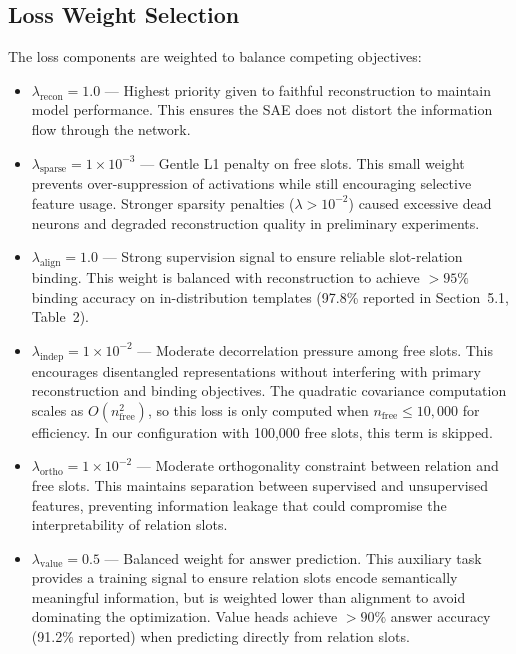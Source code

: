 \subsection{Loss Weight Selection}

The loss components are weighted to balance competing objectives:

\begin{itemize}[leftmargin=*,noitemsep]
    \item $\lambda_{\text{recon}} = 1.0$ --- Highest priority given to faithful reconstruction to maintain model performance. This ensures the SAE does not distort the information flow through the network.
    
    \item $\lambda_{\text{sparse}} = 1 \times 10^{-3}$ --- Gentle L1 penalty on free slots. This small weight prevents over-suppression of activations while still encouraging selective feature usage. Stronger sparsity penalties ($\lambda > 10^{-2}$) caused excessive dead neurons and degraded reconstruction quality in preliminary experiments.
    
    \item $\lambda_{\text{align}} = 1.0$ --- Strong supervision signal to ensure reliable slot-relation binding. This weight is balanced with reconstruction to achieve $>95\%$ binding accuracy on in-distribution templates (97.8\% reported in Section~5.1, Table~2).
    
    \item $\lambda_{\text{indep}} = 1 \times 10^{-2}$ --- Moderate decorrelation pressure among free slots. This encourages disentangled representations without interfering with primary reconstruction and binding objectives. The quadratic covariance computation scales as $O(n_{\text{free}}^2)$, so this loss is only computed when $n_{\text{free}} \leq 10{,}000$ for efficiency. In our configuration with 100,000 free slots, this term is skipped.
    
    \item $\lambda_{\text{ortho}} = 1 \times 10^{-2}$ --- Moderate orthogonality constraint between relation and free slots. This maintains separation between supervised and unsupervised features, preventing information leakage that could compromise the interpretability of relation slots.
    
    \item $\lambda_{\text{value}} = 0.5$ --- Balanced weight for answer prediction. This auxiliary task provides a training signal to ensure relation slots encode semantically meaningful information, but is weighted lower than alignment to avoid dominating the optimization. Value heads achieve $>90\%$ answer accuracy (91.2\% reported) when predicting directly from relation slots.
\end{itemize}


